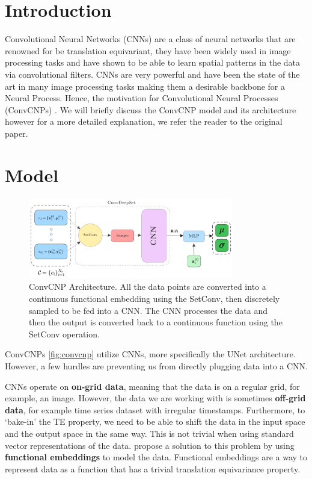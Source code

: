 \documentclass[../../main.tex]{subfiles}
\begin{document}
\section{Introduction}

Convolutional Neural Networks (CNNs) are a class of neural networks that are renowned for be translation equivariant, they have been widely used in image processing tasks and have shown to be able to learn spatial patterns in the data via convolutional filters. CNNs are very powerful and have been the state of the art in many image processing tasks making them a desirable backbone for a Neural Process. Hence, the motivation for Convolutional Neural Processes (ConvCNPs) \cite{gordon2020convolutional}. We will briefly discuss the ConvCNP model and its architecture however for a more detailed explanation, we refer the reader to the original paper.

\section{Model}

\begin{figure}[H]
	\centering
	\includegraphics[width=0.8\textwidth]{convcnp.png}
	\caption{ConvCNP Architecture. All the data points are converted into a continuous functional embedding using the SetConv, then discretely sampled to be fed into a CNN. The CNN processes the data and then the output is converted back to a continuous function using the SetConv operation.}
	\label{fig:convcnp}
\end{figure}


ConvCNPs \cite{gordon2020convolutional} \autoref{fig:convcnp} utilize CNNs, more specifically the UNet \cite{ronneberger2015unet} architecture. However, a few hurdles are preventing us from directly plugging data into a CNN.

CNNs operate on \textbf{on-grid data}, meaning that the data is on a regular grid, for example, an image. However, the data we are working with is sometimes \textbf{off-grid data}, for example time series dataset with irregular timestamps. Furthermore, to `bake-in' the TE property, we need to be able to shift the data in the input space and the output space in the same way. This is not trivial when using standard vector representations of the data. \cite{gordon2020convolutional} propose a solution to this problem by using \textbf{functional embeddings} to model the data. Functional embeddings are a way to represent data as a function that has a trivial translation equivariance property. 
\end{document}
